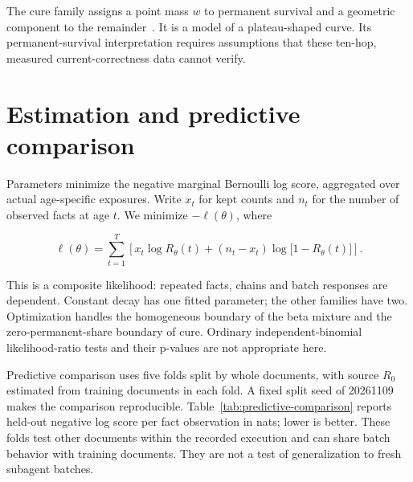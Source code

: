 \documentclass[10pt,letterpaper]{amsart}
\numberwithin{equation}{section}
\begin{document}
The cure family assigns a point mass $w$ to permanent survival and a geometric component
to the remainder~\cite{patileaVanKeilegom2017}. It is a model of a plateau-shaped curve.
Its permanent-survival interpretation requires assumptions that these ten-hop, measured
current-correctness data cannot verify.

\section{Estimation and predictive comparison}
\label{sec:estimation}

Parameters minimize the negative marginal Bernoulli log score, aggregated over actual
age-specific exposures. Write $x_t$ for kept counts and $n_t$ for the number of observed
facts at age $t$. We minimize $-\ell(\theta)$, where

\begin{equation}
  \label{eq:composite-likelihood}
  \ell(\theta) = \sum_{t=1}^{T} \left[
    x_t \log R_{\theta}(t) + (n_t-x_t)\log\bigl[1-R_{\theta}(t)\bigr]
  \right].
\end{equation}

This is a composite likelihood: repeated facts, chains and batch responses are dependent.
Constant decay has one fitted parameter; the other families have two. Optimization handles
the homogeneous boundary of the beta mixture and the zero-permanent-share boundary of
cure. Ordinary independent-binomial likelihood-ratio tests and their p-values are not
appropriate here.

Predictive comparison uses five folds split by whole documents, with source $R_0$
estimated from training documents in each fold. A fixed split seed of 20261109 makes the
comparison reproducible. Table~\ref{tab:predictive-comparison} reports held-out negative
log score per fact observation in nats; lower is better. These folds test other documents
within the recorded execution and can share batch behavior with training documents. They
are not a test of generalization to fresh subagent batches.
\end{document}
